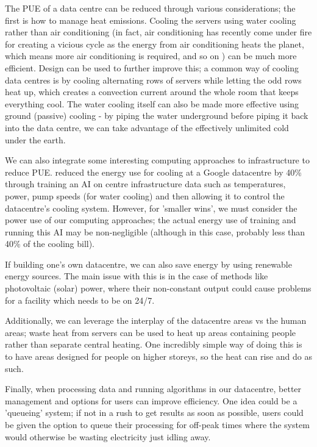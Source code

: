 \documentclass{article}
\begin{document}
The PUE of a data centre can be reduced through various considerations; the first is how to manage heat emissions. Cooling the servers using water cooling rather than air conditioning (in fact, air conditioning has recently come under fire for creating a vicious cycle as the energy from air conditioning heats the planet, which means more air conditioning is required, and so on \citep{ospina2018cooling}) can be much more efficient. Design can be used to further improve this; a common way of cooling data centres is by cooling alternating rows of servers while letting the odd rows heat up, which creates a convection current around the whole room that keeps everything cool. The water cooling itself can also be made more effective using ground (passive) cooling - by piping the water underground before piping it back into the data centre, we can take advantage of the effectively unlimited cold under the earth. \newline

We can also integrate some interesting computing approaches to infrastructure to reduce PUE. \citet{evans2016deepmind} reduced the energy use for cooling at a Google datacentre by 40\% through training an AI on centre infrastructure data such as temperatures, power, pump speeds (for water cooling) and then allowing it to control the datacentre's cooling system. However, for 'smaller wins', we must consider the power use of our computing approaches; the actual energy use of training and running this AI may be non-negligible (although in this case, probably less than 40\% of the cooling bill). \newline

If building one's own datacentre, we can also save energy by using renewable energy sources. The main issue with this is in the case of methods like photovoltaic (solar) power, where their non-constant output could cause problems for a facility which needs to be on 24/7.\newline

Additionally, we can leverage the interplay of the datacentre areas vs the human areas; waste heat from servers can be used to heat up areas containing people rather than separate central heating. One incredibly simple way of doing this is to have areas designed for people on higher storeys, so the heat can rise and do as such. \newline

Finally, when processing data and running algorithms in our datacentre, better management and options for users can improve efficiency. One idea could be a 'queueing' system; if not in a rush to get results as soon as possible, users could be given the option to queue their processing for off-peak times where the system would otherwise be wasting electricity just idling away.
\end{document}
